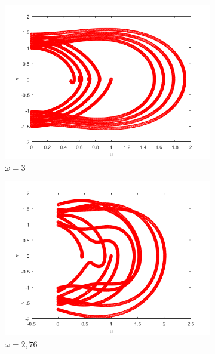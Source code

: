 \begin{figure}[h!]
\centering
\begin{subfigure}[b]{0.31\linewidth}
         \centering
         \includegraphics[width=1\linewidth]{graphics/uv_w3_r095_omega0_ksi0.png}
         \caption{$\omega=3$}
         \label{fig:w3000}
     \end{subfigure}
     \begin{subfigure}[b]{0.31\linewidth}
         \centering
         \includegraphics[width=1\linewidth]{graphics/uv_w276_r095_omega0_ksi0.png}
         \caption{$\omega=2,76$}
         \label{fig:w276}
     \end{subfigure}
     \begin{subfigure}[b]{0.31\linewidth}

\end{subfigure}
\end{figure}

